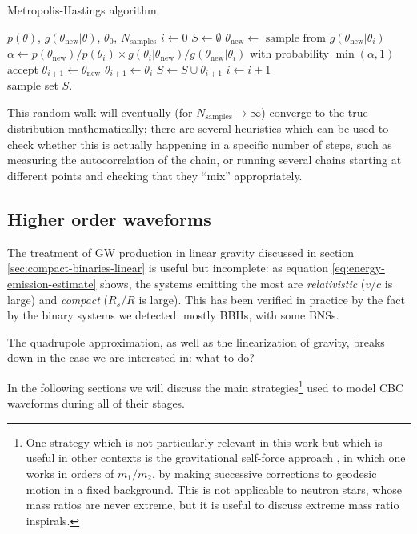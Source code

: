 \documentclass[main.tex]{subfiles}
\begin{document}
\begin{algorithm}
\caption{Metropolis-Hastings algorithm. }\label{alg:metropolis-hastings}
\begin{algorithmic}
\Require $p(\theta )$, \(g(\theta _{\text{new}} | \theta  )\), \(\theta_0 \), \(N _{\text{samples}}\)
\State $i \gets 0$
\State $S \gets \emptyset$ 
\State \(\theta _{\text{new}} \gets \text{ sample from } g(\theta _{\text{new}} | \theta_{i})\)
\State \(\alpha \gets p(\theta _{\text{new}}) / p(\theta_i) \times g(\theta _i | \theta _{\text{new}}) / g(\theta _{\text{new}} | \theta_i)\) 
\State with probability \(\min(\alpha, 1) \) accept
    \State $\theta_{i+1} \gets \theta  _{\text{new}}$
\Else
    \State $\theta _{i+1} \gets \theta _i$
\EndIf
\State \(S \gets S \cup \theta_{i+1}\)
\State \(i \gets i+1\)
\EndWhile \\
\Return sample set \(S\). 
\end{algorithmic}
\end{algorithm}

This random walk will eventually (for \(N _{\text{samples}} \to \infty \)) converge to the true distribution mathematically; there are several heuristics which can be used to check whether this is actually happening in a specific number of steps, such as measuring the autocorrelation of the chain, or running several chains starting at different points and checking that they ``mix'' appropriately. 

\subsection{Higher order waveforms}

The treatment of \ac{GW} production in linear gravity discussed in section \ref{sec:compact-binaries-linear} is useful but incomplete: as equation \eqref{eq:energy-emission-estimate} shows, the systems emitting the most are \emph{relativistic} (\(v/c\) is large) and \emph{compact} (\(R_s / R\) is large). 
This has been verified in practice by the fact by the binary systems we detected: mostly \acsp{BBH}, with some \acsp{BNS}.

The quadrupole approximation, as well as the linearization of gravity, breaks down in the case we are interested in: what to do? 

In the following sections we will discuss the main strategies\footnote{One strategy which is not particularly relevant in this work but which is useful in other contexts is the gravitational self-force approach \cite{waldIntroductionGravitationalSelfForce2009}, in which one works in orders of \(m_1 / m_2\), by making successive corrections to geodesic motion in a fixed background. This is not applicable to neutron stars, whose mass ratios are never extreme, but it is useful to discuss extreme mass ratio inspirals.} used to model \ac{CBC} waveforms during all of their stages. 
\end{document}

